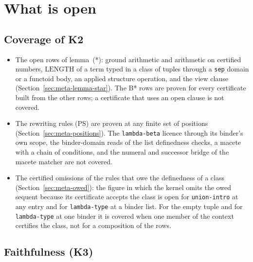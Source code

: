 \section{What is open}\label{sec:meta-open}

\subsection{Coverage of K2}

\begin{itemize}
\item The open rows of lemma~(*): ground arithmetic and arithmetic on
  certified numbers, $\mathrm{LENGTH}$ of a term typed in a class of
  tuples through a \texttt{sep} domain or a functoid body, an applied
  structure operation, and the view clause
  (Section~\ref{sec:meta-lemma-star}).  The B* rows are proven for every
  certificate built from the other rows; a certificate that uses an open
  clause is not covered.
\item The rewriting rules (PS) are proven at any finite set of positions
  (Section~\ref{sec:meta-positions}).  The \texttt{lambda-beta} licence
  through its binder's own scope, the binder-domain reads of the list
  definedness checks, a macete with a chain of conditions, and the
  numeral and successor bridge of the macete matcher are not covered.
\item The certified omissions of the rules that owe the definedness of a
  class (Section~\ref{sec:meta-owed}): the figure in which the kernel
  omits the owed sequent because its certificate accepts the class is
  open for \texttt{union-intro} at any entry and for
  \texttt{lambda-type} at a binder list.  For the empty tuple and for
  \texttt{lambda-type} at one binder it is covered when one member of
  the context certifies the class, not for a composition of the rows.
\end{itemize}

\subsection{Faithfulness (K3)}

